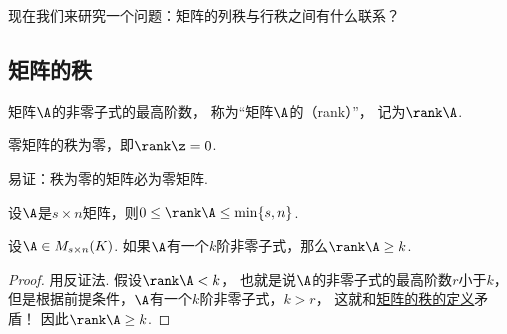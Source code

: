 现在我们来研究一个问题：矩阵的列秩与行秩之间有什么联系？

\subsection{矩阵的秩}
\begin{definition}\label{definition:线性方程组.矩阵的秩的定义}
矩阵\(\A\)的非零子式的最高阶数，
称为“矩阵\(\A\)的（rank）”，
记为\(\rank\A\).
\end{definition}

\begin{property}\label{theorem:线性方程组.矩阵的秩的性质1}
零矩阵的秩为零，即\(\rank\z = 0\).
\end{property}
\begin{remark}
易证：秩为零的矩阵必为零矩阵.
\end{remark}

\begin{property}\label{theorem:线性方程组.矩阵的秩的性质2}
设\(\A\)是\(s \times n\)矩阵，则\(0 \leq \rank\A \leq \min\{s,n\}\).
\end{property}

\begin{theorem}
设\(\A\in M_{s \times n}(K)\).
如果\(\A\)有一个\(k\)阶非零子式，那么\(\rank\A\geq k\).
\begin{proof}
用反证法.
假设\(\rank\A<k\)，
也就是说\(\A\)的非零子式的最高阶数\(r\)小于\(k\)，
但是根据前提条件，\(\A\)有一个\(k\)阶非零子式，\(k>r\)，
这就和\hyperref[definition:线性方程组.矩阵的秩的定义]{矩阵的秩的定义}矛盾！
因此\(\rank\A\geq k\).
\end{proof}
\end{theorem}

